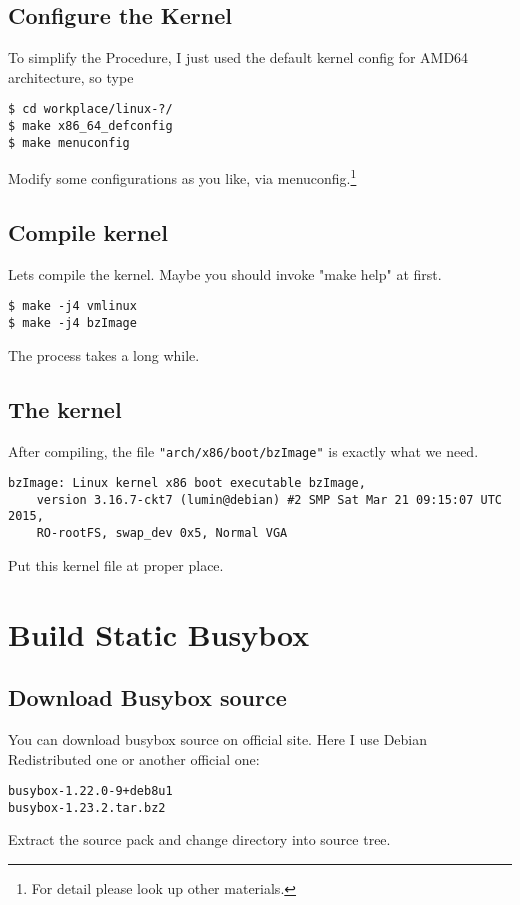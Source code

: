\documentclass[10pt,a4paper]{article}
\begin{document}
\subsection{Configure the Kernel}
To simplify the Procedure, I just used the default kernel config for AMD64 architecture, so type
\begin{framed}\begin{verbatim}
$ cd workplace/linux-?/
$ make x86_64_defconfig
$ make menuconfig
\end{verbatim}\end{framed}
Modify some configurations as you like, via menuconfig.\footnote{For detail please look up other materials.}
\subsection{Compile kernel}
Lets compile the kernel. Maybe you should invoke "make help" at first.
\begin{framed}\begin{verbatim}
$ make -j4 vmlinux
$ make -j4 bzImage
\end{verbatim}\end{framed}
The process takes a long while.
\subsection{The kernel}
After compiling, the file \texttt{"arch/x86/boot/bzImage"} is exactly what we need.
\begin{framed}\begin{verbatim}
bzImage: Linux kernel x86 boot executable bzImage,
    version 3.16.7-ckt7 (lumin@debian) #2 SMP Sat Mar 21 09:15:07 UTC 2015, 
    RO-rootFS, swap_dev 0x5, Normal VGA
\end{verbatim}\end{framed}
Put this kernel file at proper place.

\section{Build Static Busybox}
\subsection{Download Busybox source}
You can download busybox source on official site.\cite{bib:busybox.net}\newline
Here I use Debian Redistributed one or another official one:
\begin{verbatim}
busybox-1.22.0-9+deb8u1
busybox-1.23.2.tar.bz2
\end{verbatim}
Extract the source pack and change directory into source tree.
\end{document}
